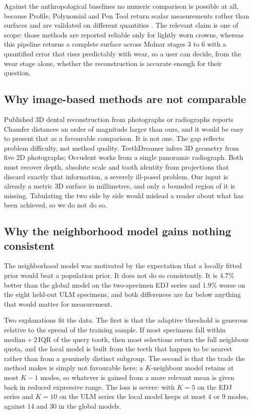 \documentclass[10pt,a4paper,twocolumn]{article}
\begin{document}
Against the anthropological baselines no numeric comparison is possible at all,
because Profile, Polynomial and Pen Tool return scalar measurements rather than
surfaces and are validated on different quantities
\citep{ohara2022reconstructing}. The relevant claim is one of scope: those
methods are reported reliable only for lightly worn crowns, whereas this pipeline
returns a complete surface across Molnar stages 3 to 6 with a quantified error that
rises predictably with wear, so a user can decide, from the wear stage alone,
whether the reconstruction is accurate enough for their question.

\subsection{Why image-based methods are not comparable}
\label{sec:imagebased}

Published 3D dental reconstruction from photographs or radiographs reports
Chamfer distances an order of magnitude larger than ours, and it would be easy to
present that as a favourable comparison. It is not one. The gap reflects problem
difficulty, not method quality. TeethDreamer \citep{teethdreamer2024} infers 3D
geometry from five 2D photographs; Occudent \citep{occudent2023} works from a
single panoramic radiograph. Both must recover depth, absolute scale and tooth
identity from projections that discard exactly that information, a severely
ill-posed problem. Our input is already a metric 3D surface in millimetres, and
only a bounded region of it is missing. Tabulating the two side by side would
mislead a reader about what has been achieved, so we do not do so.

\subsection{Why the neighborhood model gains nothing consistent}
\label{sec:tie}

The neighborhood model was motivated by the expectation that a locally fitted
prior would beat a population prior. It does not do so consistently. It is 4.7\%
better than the global model on the two-specimen EDJ series and 1.9\% worse on the
eight held-out ULM specimens, and both differences are far below anything that
would matter for measurement.

Two explanations fit the data. The first is that the adaptive threshold is
generous relative to the spread of the training sample. If most specimens fall
within $\mathrm{median} + 2\,\mathrm{IQR}$ of the query tooth, then most
selections return the full neighbour quota, and the local model is built from
the teeth that happen to be nearest rather than from a genuinely distinct
subgroup. The second is that the trade the method makes is simply not favourable
here: a $K$-neighbour model retains at most $K-1$ modes, so whatever is gained
from a more relevant mean is given back in reduced expressive range. The loss is
severe: with $K=5$ on the EDJ series and $K=10$ on the ULM series the local model
keeps at most 4 or 9 modes, against 14 and 30 in the global models.
\end{document}
